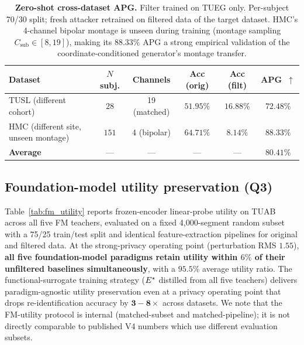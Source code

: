 \begin{table}[t]
\caption{\textbf{Zero-shot cross-dataset APG.} Filter trained on TUEG only. Per-subject 70/30 split; fresh attacker retrained on filtered data of the target dataset. HMC's 4-channel bipolar montage is unseen during training (montage sampling $C_{\text{sub}}\!\in\![8,19]$), making its $\mathbf{88.33\%}$ APG a strong empirical validation of the coordinate-conditioned generator's montage transfer.}
\label{tab:crossdataset}
\centering\small
\begin{tabular}{lccccc}
\toprule
\textbf{Dataset} & \textbf{$N$ subj.} & \textbf{Channels} & \textbf{Acc (orig)} & \textbf{Acc (filt)} & \textbf{APG}~$\uparrow$ \\
\midrule
TUSL (different cohort)   & $28$  & 19 (matched)   & $51.95\%$ & $16.88\%$ & $\mathbf{72.48\%}$ \\
HMC (different site, unseen montage) & $151$ & 4 (bipolar) & $64.71\%$ & $\mathbf{8.14\%}$ & $\mathbf{88.33\%}$ \\
\midrule
\textbf{Average}          & ---   & ---             & ---       & ---       & $\mathbf{80.41\%}$ \\
\bottomrule
\end{tabular}
\end{table}

\subsection{Foundation-model utility preservation (Q3)}
\label{sec:q3}

Table~\ref{tab:fm_utility} reports frozen-encoder linear-probe utility on TUAB across all five FM teachers, evaluated on a fixed 4{,}000-segment random subset with a 75/25 train/test split and identical feature-extraction pipelines for original and filtered data. At the strong-privacy operating point (perturbation RMS $1.55$), \textbf{all five foundation-model paradigms retain utility within $6\%$ of their unfiltered baselines simultaneously}, with a $95.5\%$ average utility ratio. The functional-surrogate training strategy ($E^{\star}$ distilled from all five teachers) delivers paradigm-agnostic utility preservation even at a privacy operating point that drops re-identification accuracy by $\mathbf{3{-}8\times}$ across datasets. We note that the FM-utility protocol is internal (matched-subset and matched-pipeline); it is not directly comparable to published V4 numbers which use different evaluation subsets.

